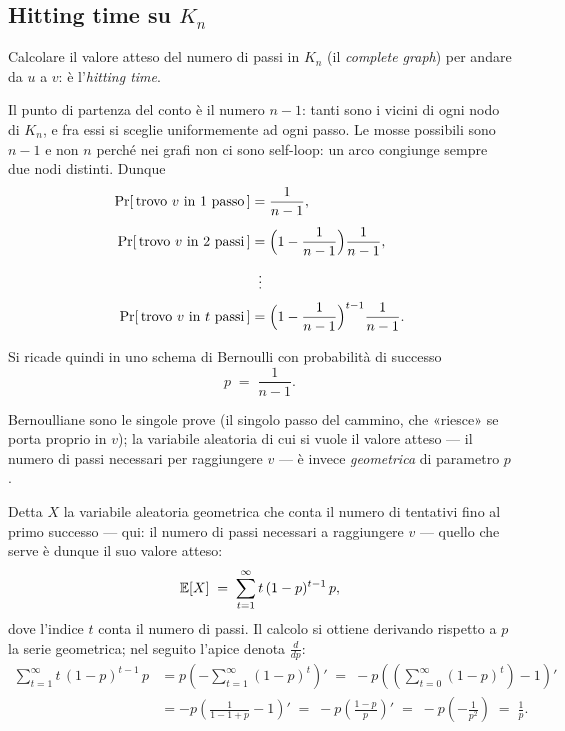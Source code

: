 \subsection{Hitting time su \texorpdfstring{$K_n$}{Kn}}

\begin{esercizio}\label{ex:hitting-kn}
Calcolare il valore atteso del numero di passi in $K_n$ (il \emph{complete graph}) per andare
da $u$ a $v$: è l'\emph{hitting time}.
\end{esercizio}

Il punto di partenza del conto è il numero $n-1$: tanti sono i vicini di ogni nodo di $K_n$,
e fra essi si sceglie uniformemente ad ogni passo. Le mosse possibili sono $n-1$ e non $n$
perché nei grafi non ci sono self-loop: un arco congiunge sempre due nodi distinti. Dunque
\begin{align*}
  \Pr[\,\text{trovo } v \text{ in } 1 \text{ passo}\,]  &= \frac{1}{n-1},\\[4pt]
  \Pr[\,\text{trovo } v \text{ in } 2 \text{ passi}\,]  &= \Bigl(1-\frac{1}{n-1}\Bigr)\frac{1}{n-1},\\[4pt]
  &\;\;\vdots\\[2pt]
  \Pr[\,\text{trovo } v \text{ in } t \text{ passi}\,]  &= \Bigl(1-\frac{1}{n-1}\Bigr)^{t-1}\frac{1}{n-1}.
\end{align*}

Si ricade quindi in uno schema di Bernoulli con probabilità di successo
\[
  p \;=\; \frac{1}{n-1}.
\]

\begin{osservazione}
Bernoulliane sono le singole prove (il singolo passo del cammino, che «riesce» se porta
proprio in $v$); la variabile aleatoria di cui si vuole il valore atteso --- il numero di
passi necessari per raggiungere $v$ --- è invece \emph{geometrica} di parametro $p$.
\end{osservazione}

Detta $X$ la variabile aleatoria geometrica che conta il numero di tentativi fino al primo
successo --- qui: il numero di passi necessari a raggiungere $v$ --- quello che serve è dunque
il suo valore atteso:
\[
  \E[X] \;=\; \sum_{t=1}^{\infty} t\,(1-p)^{t-1}\,p ,
\]
dove l'indice $t$ conta il numero di passi. Il calcolo si ottiene derivando rispetto a $p$ la
serie geometrica; nel seguito l'apice denota $\frac{d}{dp}$:
\begin{align*}
  \sum_{t=1}^{\infty} t\,(1-p)^{t-1}\,p
    &= p\left(-\sum_{t=1}^{\infty}(1-p)^{t}\right)'
     \;=\; -p\left(\left(\sum_{t=0}^{\infty}(1-p)^{t}\right)-1\right)' \\[4pt]
    &= -p\left(\frac{1}{1-1+p}-1\right)'
     \;=\; -p\left(\frac{1-p}{p}\right)'
     \;=\; -p\left(-\frac{1}{p^{2}}\right)
     \;=\; \frac{1}{p} .
\end{align*}

